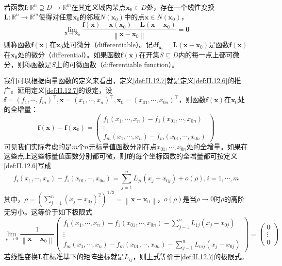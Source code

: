 \documentclass[main.tex]{subfiles}
\begin{document}
\begin{definition}\label{def:II.12.7}
若函数$\mathbf{f}:\mathbb{R}^n\supseteq D\rightarrow\mathbb{R}^m$在其定义域内某点$\mathbf{x}_0\in D$处，存在一个线性变换$\mathbf{L}:\mathbb{R}^n\rightarrow\mathbb{R}^m$使得对任意$\mathbf{x}_0$的邻域$N\left(\mathbf{x}_0\right)$中的点$\mathbf{x}\in N\left(\mathbf{x}_0\right)$，
\[\lim_{\mathbf{x}\rightarrow\mathbf{x}_0}\frac{\mathbf{f}\left(\mathbf{x}\right)-\mathbf{x}\left(\mathbf{x}_0\right)-\mathbf{L}\left(\mathbf{x}-\mathbf{x}_0\right)}{\left\|\mathbf{x}-\mathbf{x}_0\right\|}=\mathbf{0}\]
则称函数$\mathbf{f}\left(\mathbf{x}\right)$在$\mathbf{x}_0$处可微分（differentiable）。记$d\mathbf{f}_{\mathbf{x}_0}=\mathbf{L}\left(\mathbf{x}-\mathbf{x}_0\right)$是函数$\mathbf{f}\left(\mathbf{x}\right)$在$\mathbf{x}_0$处的微分（differential）。如果函数$\mathbf{f}\left(\mathbf{x}\right)$在开集$S\subseteq D$内的每一点上都可微分，则称函数是$S$上的可微函数（differentiable function）。
\end{definition}

我们可以根据向量函数的定义来看出，定义\ref{def:II.12.7}就是定义\ref{def:II.12.6}的推广。延用定义\ref{def:II.12.7}的设定，设$\mathbf{f}=\left(f_1,\cdots,f_m\right)^\intercal,\mathbf{x}=\left(x_1,\cdots,x_n\right)^\intercal,\mathbf{x}_0=\left(x_{01},\cdots,x_{0n}\right)^\intercal$，则函数$\mathbf{f}\left(\mathbf{x}\right)$在$\mathbf{x}_0$处的全增量：
\[
    \mathbf{f}\left(\mathbf{x}\right)-\mathbf{f}\left(\mathbf{x}_0\right)=\left(
    \begin{array}{c}
        f_1\left(x_1,\cdots,x_n\right)-f_1\left(x_{01},\cdots,x_{0n}\right)\\
    \vdots\\
    f_m\left(x_1,\cdots,x_n\right)-f_m\left(x_{01},\cdots,x_{0n}\right)
    \end{array}\right)
\]
可见我们实际考虑的是$m$个$n$元标量值函数分别在点$x_{01},\cdots,x_{0n}$处的全增量。如果在这些点上这些标量值函数分别都可微，则$\mathbf{f}$的每个坐标函数的全增量都可按定义\ref{def:II.12.6}写成
\[
f_i\left(x_1,\cdots,x_n\right)-f_i\left(x_{01},\cdots,x_{0n}\right)=\sum_{j=1}^n L_{ji}\left(x_j-x_{0j}\right)+o\left(\rho\right),i=1,\cdots,m
\]
其中，$\rho=\left(\sum_{j=1}^n\left(x_j-x_{0j}\right)^2\right)^{1/2}=\left\|\mathbf{x}-\mathbf{x}_0\right\|$，$o\left(\rho\right)$是当$\rho\to 0$时$\rho$的高阶无穷小。这等价于如下极限式
\[
\lim_{\rho\to 0}\frac{1}{\left\|\mathbf{x}-\mathbf{x}_0\right\|}\left(\begin{array}{c}
f_1\left(x_1,\cdots,x_n\right)-f_1\left(x_{01},\cdots,x_{0n}\right)-\sum_{j-1}^nL_{1j}\left(x_j-x_{0j}\right)\\
\vdots\\
f_m\left(x_1,\cdots,x_n\right)-f_m\left(x_{01},\cdots,x_{0n}\right)-\sum_{j-1}^nL_{mj}\left(x_j-x_{0j}\right)
\end{array}\right)=\left(\begin{array}{c}0\\\vdots\\0\end{array}\right)
\]
若线性变换$\mathbf{L}$在标准基下的矩阵坐标就是$L_{ij}$，则上式等价于\ref{def:II.12.7}的极限式。
\end{document}
